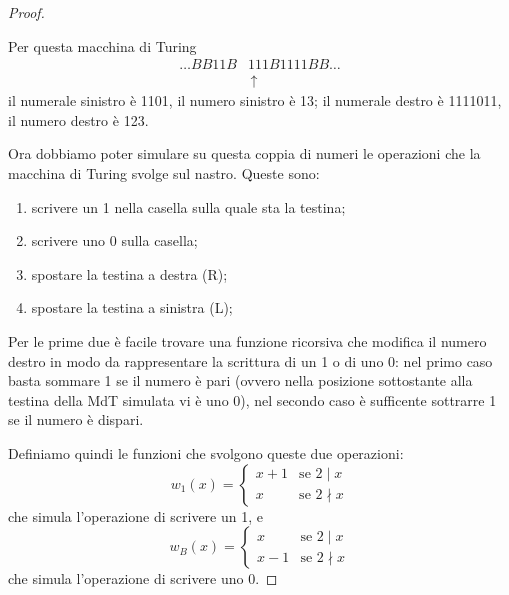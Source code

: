 \begin{proof}
\begin{esempio}
Per questa macchina di Turing
\begin{align*}
\dots BB11B&111B1111BB \dots\\
&\,\uparrow
\end{align*}
il numerale sinistro è 1101, il numero sinistro è 13; il numerale destro è
1111011, il numero destro è 123.
\end{esempio}

Ora dobbiamo poter simulare su questa coppia di numeri le operazioni che la
macchina di Turing svolge sul nastro. Queste sono:
\begin{enumerate}
 \item scrivere un 1 nella casella sulla quale sta la testina;
 \item scrivere uno 0 sulla casella;
 \item spostare la testina a destra (R);
 \item spostare la testina a sinistra (L);
\end{enumerate}

Per le prime due è facile trovare una funzione ricorsiva che modifica il
numero destro in modo da rappresentare la scrittura di un 1 o di uno 0: nel
primo caso basta sommare 1 se il numero è pari (ovvero nella posizione
sottostante alla testina della MdT simulata vi è uno 0), nel secondo caso è
sufficente sottrarre 1 se il numero è dispari.

Definiamo quindi le funzioni che svolgono queste due operazioni:
$$w_1(x) = \left\{
\begin{array}{ll}
x+1 & \text{se } 2 \mid x\\
x & \text{se } 2 \nmid x
\end{array}
\right.$$
che simula l'operazione di scrivere un 1, e
$$w_B(x) = \left\{
\begin{array}{ll}
x & \text{se } 2 \mid x\\
x-1 & \text{se } 2 \nmid x
\end{array}
\right.$$
che simula l'operazione di scrivere uno 0.


\end{proof}
